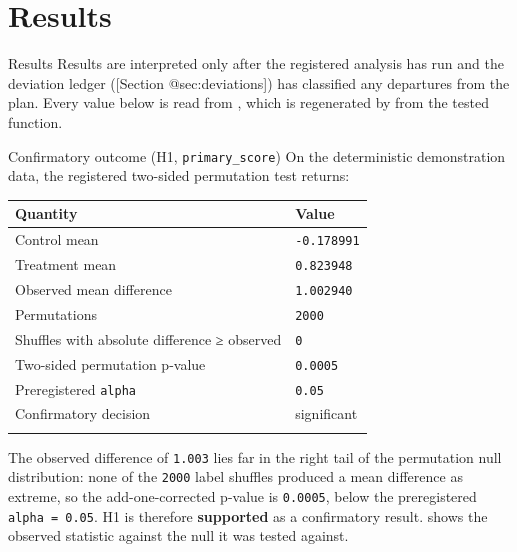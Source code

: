 \documentclass[
  ignorenonframetext,
]{beamer}
\author{\texorpdfstring{}{}}
\date{}
\newcounter{none} %
\begin{document}
\section{Results}\label{sec:results}

\begin{frame}{Results}
Results are interpreted only after the registered analysis has run and
the deviation ledger ({[}Section @sec:deviations{]}) has classified any
departures from the plan. Every value below is read from
, which is regenerated by
 from the tested
 function.
\end{frame}

\begin{frame}{Confirmatory outcome (H1,
\texttt{primary\_score})}
\protect{}\label{confirmatory-outcome-h1-primary_score}
On the deterministic demonstration data, the registered two-sided
permutation test returns:

{\def\LTcaptype{none} %
\begin{longtable}[]{@{}ll@{}}
\toprule\noalign{}
Quantity & Value \\
\midrule\noalign{}
\endhead
Control mean & \texttt{-0.178991} \\
Treatment mean & \texttt{0.823948} \\
Observed mean difference & \texttt{1.002940} \\
Permutations & \texttt{2000} \\
Shuffles with absolute difference ≥ observed & \texttt{0} \\
Two-sided permutation p-value & \texttt{0.0005} \\
Preregistered \texttt{alpha} & \texttt{0.05} \\
Confirmatory decision & significant \\
\bottomrule\noalign{}
\end{longtable}
}

The observed difference of \texttt{1.003} lies far in the right tail of
the permutation null distribution: none of the \texttt{2000} label
shuffles produced a mean difference as extreme, so the add-one-corrected
p-value is \texttt{0.0005}, below the preregistered
\texttt{alpha\ =\ 0.05}. H1 is therefore \textbf{supported} as a
confirmatory result.  shows the observed
statistic against the null it was tested against.


\end{frame}
\end{document}
